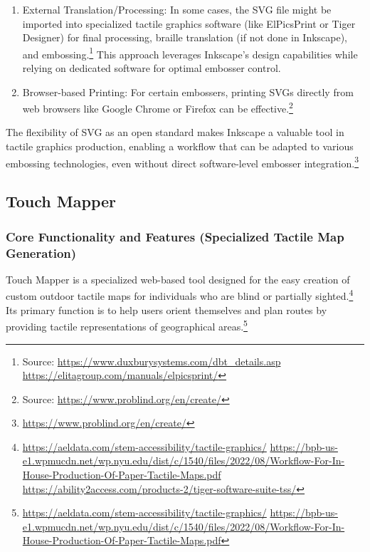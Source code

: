 \begin{enumerate}
\begin{itemize}
        \item The workflow may involve duplicating layers for color and black-and-white versions for combined tactile and visual prints.\footnote{\url{https://www.duxburysystems.org/documentation/NimPro/quick.htm}}
    \end{itemize}
    \item External Translation/Processing: In some cases, the SVG file might be imported into specialized tactile graphics software (like ElPicsPrint or Tiger Designer) for final processing, braille translation (if not done in Inkscape), and embossing.\footnote{Source:  \url{https://www.duxburysystems.com/dbt_details.asp} \url{https://elitagroup.com/manuals/elpicsprint/}} This approach leverages Inkscape's design capabilities while relying on dedicated software for optimal embosser control.
    \item Browser-based Printing: For certain embossers, printing SVGs directly from web browsers like Google Chrome or Firefox can be effective.\footnote{Source:  \url{https://www.problind.org/en/create/}}
\end{enumerate}

The flexibility of SVG as an open standard makes Inkscape a valuable tool in tactile graphics production, enabling a workflow that can be adapted to various embossing technologies, even without direct software-level embosser integration.\footnote{\url{https://www.problind.org/en/create/}}

\subsection{Touch Mapper}

\subsubsection{Core Functionality and Features (Specialized Tactile Map Generation)}

Touch Mapper is a specialized web-based tool designed for the easy creation of custom outdoor tactile maps for individuals who are blind or partially sighted.\footnote{\url{https://aeldata.com/stem-accessibility/tactile-graphics/} \url{https://bpb-us-e1.wpmucdn.net/wp.nyu.edu/dist/c/1540/files/2022/08/Workflow-For-In-House-Production-Of-Paper-Tactile-Maps.pdf} \url{https://ability2access.com/products-2/tiger-software-suite-tss/}} Its primary function is to help users orient themselves and plan routes by providing tactile representations of geographical areas.\footnote{\url{https://aeldata.com/stem-accessibility/tactile-graphics/} \url{https://bpb-us-e1.wpmucdn.net/wp.nyu.edu/dist/c/1540/files/2022/08/Workflow-For-In-House-Production-Of-Paper-Tactile-Maps.pdf}}

